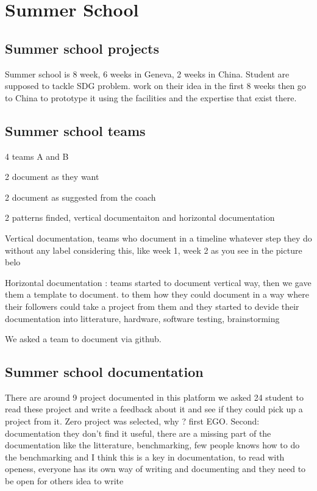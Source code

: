 \chapter{Summer School}

\section{Summer school projects}
\label{sec:scprojects}
Summer school is 8 week, 6 weeks in Geneva, 2 weeks in China.
Student are supposed to tackle SDG problem.
work on their idea in the first 8 weeks then go to China to prototype it using the facilities and the expertise that exist there.


\section{Summer school teams}
\label{sec:scteams}
4 teams A and B

2 document as they want

2 document as suggested from the coach

2 patterns finded, vertical documentaiton  and horizontal documentation


Vertical documentation, teams who document in a timeline whatever step they do without any label considering this, like week 1, week 2 as you see in the picture belo

Horizontal documentation : teams started to document vertical way, then we gave them a template to document.
 to them how they could document in a way where their followers could take a project from them and they started to devide their documentation into litterature, hardware, software testing, brainstorming

We asked a team to document via github.





\section{Summer school documentation}
There are around 9 project documented in this platform
we asked 24 student to read these project and write a feedback about it and see if they could pick up a project from it.
Zero project was selected, why ?
first EGO. 
Second: documentation they don't find it useful, there are a missing part of the documentation like the litterature, benchmarking, few people knows how to do the benchmarking and I think this is a key in documentation,  to read with openess, everyone has its own way of writing and documenting and they need to be open for others idea to write 
\label{sec:scdocumentation}
